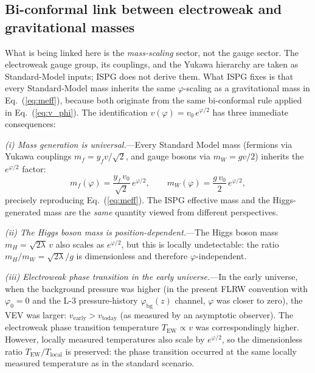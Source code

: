 \documentclass[aps,prd,onecolumn,superscriptaddress,nofootinbib,showpacs,12pt,notitlepage]{revtex4-2}
\begin{document}
\subsection{Bi-conformal link between electroweak and gravitational masses}
\label{sec:ew_grav}

What is being linked here is the \emph{mass-scaling}
sector, not the gauge sector.  The electroweak gauge
group, its couplings, and the Yukawa hierarchy are
taken as Standard-Model inputs; ISPG does not derive
them.  What ISPG fixes is that every Standard-Model
mass inherits the same $\varphi$-scaling as a
gravitational mass in Eq.~(\ref{eq:meff}), because both
originate from the same bi-conformal rule applied in
Eq.~(\ref{eq:v_phi}).  The identification
$v(\varphi) = v_0\,e^{\varphi/2}$ has three immediate
consequences:

\textit{(i) Mass generation is universal.}---Every Standard
Model mass (fermions via Yukawa couplings $m_f = y_f v/\sqrt{2}$,
and gauge bosons via $m_W = gv/2$) inherits the
$e^{\varphi/2}$ factor:
\begin{equation}\label{eq:all_masses}
  m_f(\varphi) = \frac{y_f\,v_0}{\sqrt{2}}\,e^{\varphi/2},
  \qquad
  m_W(\varphi) = \frac{g\,v_0}{2}\,e^{\varphi/2},
\end{equation}
precisely reproducing Eq.~(\ref{eq:meff}).  The ISPG
effective mass and the Higgs-generated mass are the
\emph{same} quantity viewed from different perspectives.

\textit{(ii) The Higgs boson mass is position-dependent.}---The
Higgs boson mass $m_H = \sqrt{2\lambda}\,v$ also scales as
$e^{\varphi/2}$, but this is locally undetectable: the ratio
$m_H/m_W = \sqrt{2\lambda}/g$ is dimensionless and therefore
$\varphi$-independent.

\textit{(iii) Electroweak phase transition in the early
universe.}---In the early universe, when the background
pressure was higher (in the present FLRW convention with
$\varphi_0=0$ and the L-3 pressure-history
$\varphi_{\mathrm{bg}}(z)$ channel, $\varphi$ was closer
to zero), the VEV
was larger: $v_{\mathrm{early}} > v_{\mathrm{today}}$ (as
measured by an asymptotic observer).  The electroweak
phase transition temperature $T_{\mathrm{EW}} \propto v$
was correspondingly higher.  However, locally measured
temperatures also scale by $e^{\varphi/2}$, so the
dimensionless ratio $T_{\mathrm{EW}}/T_{\mathrm{local}}$
is preserved: the phase transition occurred at the same
locally measured temperature as in the standard scenario.
\end{document}
